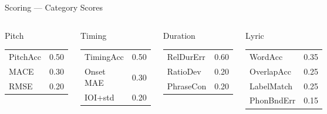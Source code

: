 \documentclass[aspectratio=169,9pt]{beamer}
\begin{document}
\begin{frame}{Scoring --- Category Scores}
  \medskip
  \begin{columns}[T]
      \begin{exampleblock}{\footnotesize Pitch}
        \footnotesize
        \begin{tabular}{@{}lr@{}}
          PitchAcc & 0.50 \\
          MACE     & 0.30 \\
          RMSE     & 0.20 \\
        \end{tabular}
      \end{exampleblock}
      \begin{exampleblock}{\footnotesize Timing}
        \footnotesize
        \begin{tabular}{@{}lr@{}}
          TimingAcc & 0.50 \\
          Onset MAE & 0.30 \\
          IOI+std   & 0.20 \\
        \end{tabular}
      \end{exampleblock}
      \begin{exampleblock}{\footnotesize Duration}
        \footnotesize
        \begin{tabular}{@{}lr@{}}
          RelDurErr & 0.60 \\
          RatioDev  & 0.20 \\
          PhraseCon & 0.20 \\
        \end{tabular}
      \end{exampleblock}
      \begin{exampleblock}{\footnotesize Lyric}
        \footnotesize
        \begin{tabular}{@{}lr@{}}
          WordAcc     & 0.35 \\
          OverlapAcc  & 0.25 \\
          LabelMatch  & 0.25 \\
          PhonBndErr  & 0.15 \\
        \end{tabular}
      \end{exampleblock}
  \end{columns}


\end{frame}
\end{document}
